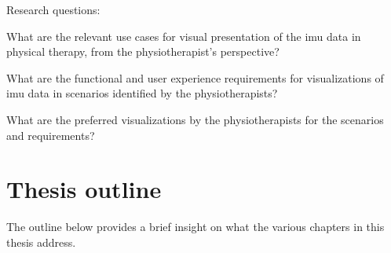 Research questions:
\vspace{-15pt}
\begin{description}[parsep=0pt, itemsep=0pt]
\item[Research Question 1:] What are the relevant use cases for visual presentation of the \gls{imu} data in physical therapy, from the physiotherapist's perspective?

\item[Research Question 2:] What are the functional and user experience requirements for visualizations of \gls{imu} data in scenarios identified by the physiotherapists?

\item[Research Question 3:] What are the preferred visualizations by the physiotherapists for the scenarios and requirements?
\end{description}

\section{Thesis outline}
The outline below provides a brief insight on what the various chapters in this thesis address.

